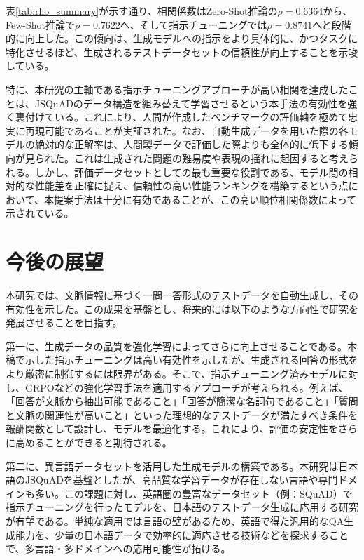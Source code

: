 \documentclass[twocolumn]{jsarticle}
\begin{document}
表\ref{tab:rho_summary}が示す通り、相関係数はZero-Shot推論の$\rho=0.6364$から、Few-Shot推論で$\rho=0.7622$へ、そして指示チューニングでは$\rho=0.8741$へと段階的に向上した。この傾向は、生成モデルへの指示をより具体的に、かつタスクに特化させるほど、生成されるテストデータセットの信頼性が向上することを示唆している。

特に、本研究の主軸である指示チューニングアプローチが高い相関を達成したことは、JSQuADのデータ構造を組み替えて学習させるという本手法の有効性を強く裏付けている。これにより、人間が作成したベンチマークの評価軸を極めて忠実に再現可能であることが実証された。なお、自動生成データを用いた際の各モデルの絶対的な正解率は、人間製データで評価した際よりも全体的に低下する傾向が見られた。これは生成された問題の難易度や表現の揺れに起因すると考えられる。しかし、評価データセットとしての最も重要な役割である、モデル間の相対的な性能差を正確に捉え、信頼性の高い性能ランキングを構築するという点において、本提案手法は十分に有効であることが、この高い順位相関係数によって示されている。



\section{今後の展望}

本研究では、文脈情報に基づく一問一答形式のテストデータを自動生成し、その有効性を示した。この成果を基盤とし、将来的には以下のような方向性で研究を発展させることを目指す。

第一に、生成データの品質を強化学習によってさらに向上させることである。本稿で示した指示チューニングは高い有効性を示したが、生成される回答の形式をより厳密に制御するには限界がある。そこで、指示チューニング済みモデルに対し、GRPOなどの強化学習手法を適用するアプローチが考えられる\cite{Instruction Pre-Training}。例えば、「回答が文脈から抽出可能であること」「回答が簡潔な名詞句であること」「質問と文脈の関連性が高いこと」といった理想的なテストデータが満たすべき条件を報酬関数として設計し、モデルを最適化する。これにより、評価の安定性をさらに高めることができると期待される。

第二に、異言語データセットを活用した生成モデルの構築である。本研究は日本語のJSQuAD\cite{JSQuAD}を基盤としたが、高品質な学習データが存在しない言語や専門ドメインも多い。この課題に対し、英語圏の豊富なデータセット（例：SQuAD\cite{SQuAD}）で指示チューニングを行ったモデルを、日本語のテストデータ生成に応用する研究が有望である。単純な適用では言語の壁があるため、英語で得た汎用的なQA生成能力を、少量の日本語データで効率的に適応させる技術などを探求することで、多言語・多ドメインへの応用可能性が拓ける。
\end{document}
